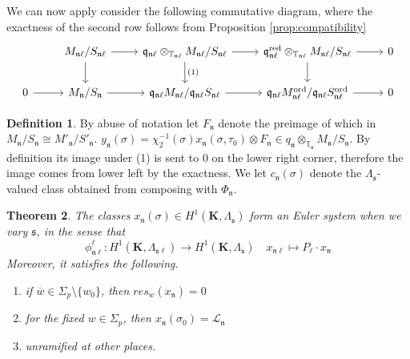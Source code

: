 \documentclass[leqno]{amsart}
\newtheorem{thm}{Theorem}[section]
\theoremstyle{definition}
\newtheorem{defn}[thm]{Definition}
\theoremstyle{remark}
\newcommand{\fs}{\mathfrak{s}}
\newcommand{\fn}{\mathfrak{n}}
\newcommand{\fq}{\mathfrak{q}}
\newcommand{\red}{\textnormal{red}}
\newcommand{\K}{{\mathbf{K}}} %
\newcommand{\bw}{\overline{w}}
\newcommand{\TT}{\mathbb{T}} %
\newcommand{\ord}{\textnormal{ord}} %
\begin{document}
We can now apply consider the following 
commutative diagram,
where the exactness of the second row
follows from
Proposition \ref{prop:compatibility}
\[
\begin{tikzcd}
&M_{\fn\ell}/S_{\fn\ell}\arrow[r]\arrow[d]&
\fq_{\fn\ell}\otimes_{\TT_{\fn\ell}}
	M_{\fn\ell}/S_{\fn\ell}\arrow[r]\arrow[d,"(1)"]&
\fq_{\fn\ell}^{\red}\otimes_{\TT_{\fn\ell}}
	M_{\fn\ell}/S_{\fn\ell}\arrow[r]\arrow[d]&0\\
0\arrow[r]&
M_\fn/S_\fn \arrow[r]&
\fq_{\fn\ell}M_{\fn\ell}/\fq_{\fn\ell}S_{\fn\ell} \arrow[r]&
\fq_{\fn\ell}M^{\ord}_{\fn\ell}/
\fq_{\fn\ell}S^{\ord}_{\fn\ell} \arrow[r] &0
\end{tikzcd}
\]

\begin{defn}
	By abuse of notation
	let $F_\fn$
	denote the preimage of which in
	$M_{\fn}/S_{\fn}\cong M'_\fn/S'_\fn$.
	$y_\fn(\sigma)=\chi_2^{-1}(\sigma)
	x_{\fn}(\sigma,\tau_0)\otimes
	F_{\fn}\in 
	q_{\fn}\otimes_{\TT_{\fn}}M_{\fn}/S_{\fn}$.
	By definition
	its image under (1) is sent to $0$
	on the lower right corner,
	therefore the image
	comes from lower left 
	by the exactness.
	We let  $c_{\fn}(\sigma)$
	denote the $\Lambda_{\fs}$-valued
	class obtained from composing
	with $\Phi_\fn$.
\end{defn}

\begin{thm}
	The classes $x_{\fn}(\sigma)\in 
	H^1(\K, \Lambda_{\fs})$
	form an Euler system when we vary $\fs$,
	in the sense that 
	\[
		\phi_{\fn\ell}^{\ell}\colon
		H^1(\K,\Lambda_{\fs\ell})\to 
		H^1(\K,\Lambda_{\fs})\quad
		x_{\fn\ell}\mapsto
		P_\ell\cdot x_\fn
	\]
	Moreover, it satisfies the following.
	\begin{enumerate}[label=(\alph*)]
		\item if $\bw\in \Sigma_p\setminus\{w_0\}$,
		then  $res_w(x_\fn)=0$
	\item for the fixed  $w\in \Sigma_p$,
		then  $x_\fn(\sigma_0)=\mathcal{L}_\fn$
	\item unramified at other places.
	\end{enumerate}
\end{thm}
\end{document}
